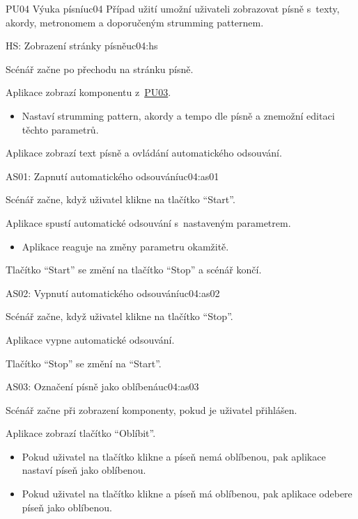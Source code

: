 \begin{usecase}{PU04 Výuka písní}{uc04}
    Případ užití umožní uživateli zobrazovat písně s~texty, akordy, metronomem a doporučeným strumming patternem.

    \begin{scenario}{HS: Zobrazení stránky písně}{uc04:hs}
        \item Scénář začne po přechodu na stránku písně.
        \item Aplikace zobrazí komponentu z~\hyperref[uc03]{PU03}.
        \begin{itemize}
            \item Nastaví strumming pattern, akordy a tempo dle písně a znemožní editaci těchto parametrů.
        \end{itemize}
        \item Aplikace zobrazí text písně a ovládání automatického odsouvání.
    \end{scenario}

    \begin{scenario}{AS01: Zapnutí automatického odsouvání}{uc04:as01}
        \item Scénář začne, když uživatel klikne na tlačítko \enquote{Start}.
        \item Aplikace spustí automatické odsouvání s~nastaveným parametrem.
        \begin{itemize}
            \item Aplikace reaguje na změny parametru okamžitě.
        \end{itemize}
        \item Tlačítko \enquote{Start} se změní na tlačítko \enquote{Stop} a scénář končí.
    \end{scenario}

    \begin{scenario}{AS02: Vypnutí automatického odsouvání}{uc04:as02}
        \item Scénář začne, když uživatel klikne na tlačítko \enquote{Stop}.
        \item Aplikace vypne automatické odsouvání.
        \item Tlačítko \enquote{Stop} se změní na \enquote{Start}.
    \end{scenario}

    \begin{scenario}{AS03: Označení písně jako oblíbená}{uc04:as03}
        \item Scénář začne při zobrazení komponenty, pokud je uživatel přihlášen.
        \item Aplikace zobrazí tlačítko \enquote{Oblíbit}.
        \begin{itemize}
            \item Pokud uživatel na tlačítko klikne a píseň nemá oblíbenou, pak aplikace nastaví píseň jako oblíbenou.
            \item Pokud uživatel na tlačítko klikne a píseň má oblíbenou, pak aplikace odebere píseň jako oblíbenou.
        \end{itemize}
    \end{scenario}
\end{usecase}
